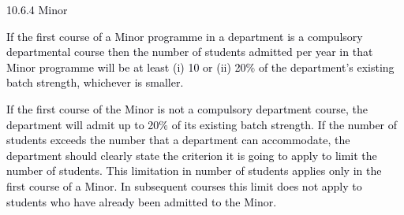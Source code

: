 \documentclass[12pt]{article}
\begin{document}
\vspace{\baselineskip}
{\fontsize{10pt}{12.0pt}\selectfont \textcolor[HTML]{00000A}{10.6.4 Minor}\par}\par


\vspace{\baselineskip}
\begin{justify}
{\fontsize{10pt}{12.0pt}\selectfont \textcolor[HTML]{00000A}{If the first course of a Minor programme in a department is a compulsory departmental course then the number of students admitted per year in that Minor programme will be at least (i) 10 or (ii) 20$\%$  of the department's existing batch strength, whichever is smaller.}\par}
\end{justify}\par


\vspace{\baselineskip}
\begin{justify}
{\fontsize{10pt}{12.0pt}\selectfont \textcolor[HTML]{00000A}{If the first course of the Minor is not a compulsory department course, the department will admit up to 20$\%$  of its existing batch strength. If the number of students exceeds the number that a department can accommodate, the department should clearly state the criterion it is going to apply to limit the number of students. This limitation in number of students applies only in the first course of a Minor. In subsequent courses this limit does not apply to students who have already been admitted to the Minor.}\par}
\end{justify}\par


\vspace{\baselineskip}

\vspace{\baselineskip}

\vspace{\baselineskip}

\vspace{\baselineskip}

\vspace{\baselineskip}

\vspace{\baselineskip}

\vspace{\baselineskip}

\vspace{\baselineskip}
\end{document}
